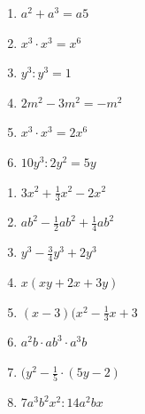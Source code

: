 \begin{exercicios}


\begin{multicols}{2}

\begin{enumerate}[label=\alph*)]

\item $a^2  + a^3  = a5$

\item $x^3  \cdot  x^3 = x^6$

\item $y^3 : y^3 = 1$

\item $2m^2 - 3m^2 = -m^2$

\item $x^3 \cdot x^3 = 2x^6$

\item $10y^3 : 2y^2 = 5y$

\end{enumerate}

\end{multicols}


\begin{multicols}{2}

\begin{enumerate}[label=\alph*)]
    \item $3x^2 + \frac{1}{3}x^2 - 2x^2$
    
    \item $ab^2 - \frac{1}{2}ab^2 + \frac{1}{4}ab^2$
    
    \item $y^3 - \frac{3}{4}y^3 + 2y^3$
    
    \item $x(xy+2x+3y)$
    
    \item $(x-3)(x^2-\frac{1}{3}x+3$
    
    \item $a^2b \cdot ab^3 \cdot a^3b$
    
    \item $(y^2-\frac{1}{5} \cdot (5y-2)$
    
    \item $7a^3b^2x^2 : 14a^2bx$
    

\end{enumerate}
\end{multicols}
\end{exercicios}
